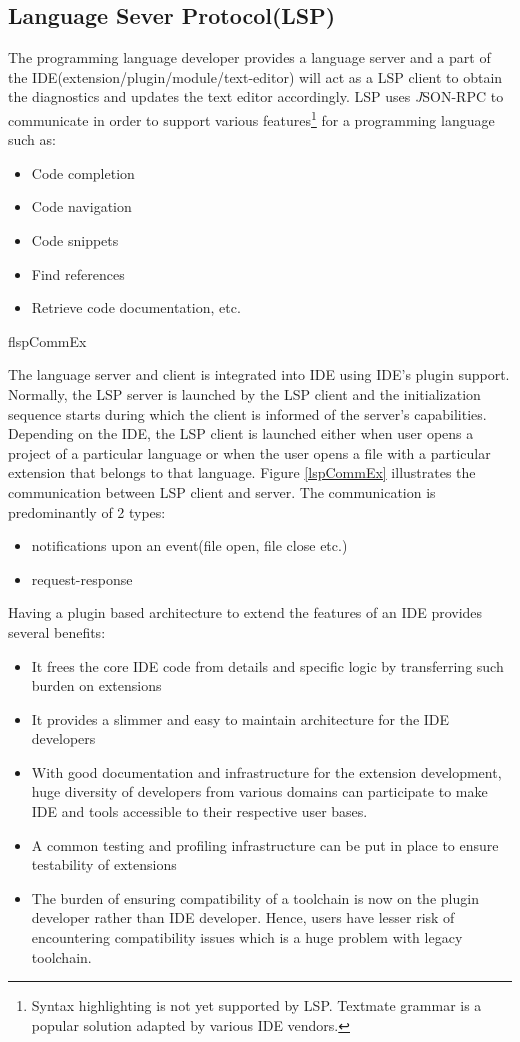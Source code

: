 \documentclass[dvipsnames]{article}
\newcommand{\loadFig}[1]{{%
  \expandafter\let\csname if#1\endcsname\iftrue%
  }
}%
\begin{document}
\subsection{Language Sever Protocol(LSP)}
The programming language developer provides a language server and a part of the IDE(extension/plugin/module/text-editor) will act as a LSP client to obtain the diagnostics and updates the text editor accordingly.
LSP uses {\textit JSON-RPC} to communicate in order to support various features\footnote{Syntax highlighting is not yet supported by LSP. Textmate grammar is a popular solution adapted by various IDE vendors.} for a programming language such as:
\begin{itemize}
\item Code completion
\item Code navigation
\item Code snippets
\item Find references
\item Retrieve code documentation, etc.
\end{itemize}

\loadFig{lspCommEx}

The language server and client is integrated into IDE using IDE's plugin support.
Normally, the LSP server is launched by the LSP client and the initialization sequence starts during which the client is informed of the server's capabilities.
Depending on the IDE, the LSP client is launched either when user opens a project of a particular language or when the user opens a file with a particular extension that belongs to that language.
Figure \ref{lspCommEx} illustrates the communication between LSP client and server.
The communication is predominantly of 2 types:
\begin{itemize}
  \item notifications upon an event(file open, file close etc.)
  \item request-response
\end{itemize}

Having a plugin based architecture to extend the features of an IDE provides several benefits:
\begin{itemize}
  \item It frees the core IDE code from details and specific logic by transferring such burden on extensions
  \item It provides a slimmer and easy to maintain architecture for the IDE developers
  \item With good documentation and infrastructure for the extension development, huge diversity of developers from various domains can participate to make IDE and tools accessible to their respective user bases.
  \item A common testing and profiling infrastructure can be put in place to ensure testability of extensions
  \item The burden of ensuring compatibility of a toolchain is now on the plugin developer rather than IDE developer. Hence, users have lesser risk of encountering compatibility issues which is a huge problem with legacy toolchain.
\end{itemize}
\end{document}

